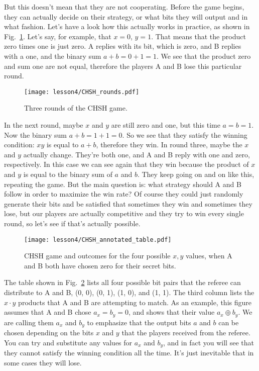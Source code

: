 But this doesn't mean that they are not cooperating. Before the game begins, they can actually decide on their strategy, or what bits they will output and in what fashion. Let's have a look how this actually works in practice, as shown in Fig.~\ref{fig:chsh-game-rounds}. Let's say, for example, that $x =0$, $y = 1$. That means that the product zero times one is just zero. A replies with its bit, which is zero, and B replies with a one, and the binary sum $a + b = 0 + 1 = 1$. We see that the product zero and sum one are not equal, therefore the players A and B lose this particular round.
\begin{figure}[H]
    \centering
    \texttt{[image: lesson4/CHSH\_rounds.pdf]}
        \caption{Three rounds of the CHSH game.}
    \label{fig:chsh-game-rounds}
\end{figure}

In the next round, maybe $x$ and $y$ are still zero and one, but this time $a = b = 1$. Now the binary sum $a + b = 1 + 1 = 0$. So we see that they satisfy the winning condition: $xy$ is equal to $a + b$, therefore they win. In round three, maybe the $x$ and $y$ actually change. They're both one, and A and B reply with one and zero, respectively. In this case we can see again that they win because the product of $x$ and $y$ is equal to the binary sum of $a$ and $b$. They keep going on and on like this, repeating the game. But the main question is: what strategy should A and B follow in order to maximize the win rate? Of course they could just randomly generate their bits and be satisfied that sometimes they win and sometimes they lose, but our players are actually competitive and they try to win every single round, so let's see if that's actually possible.

\begin{figure}[H]
    \centering
    \texttt{[image: lesson4/CHSH\_annotated\_table.pdf]}
        \caption[CHSH game and outcomes]{CHSH game and outcomes for the four possible $x, y$ values, when A and B both have chosen zero for their secret bits.}
    \label{fig:chsh-table}
\end{figure}

The table shown in Fig.~\ref{fig:chsh-table} lists all four possible bit pairs that the referee can distribute to A and B, (0, 0), (0, 1), (1, 0), and (1, 1). The third column lists the $x\cdot y$ products that A and B are attempting to match. As an example, this figure assumes that A and B chose $a_x = b_y = 0$, and shows that their value $a_x \oplus b_y$. We are calling them $a_x$ and $b_y$ to emphasize that the output bits $a$ and $b$ can be chosen depending on the bits $x$ and $y$ that the players received from the referee. You can try and substitute any values for $a_x$ and $b_y$, and in fact you will see that they cannot satisfy the winning condition all the time. It's just inevitable that in some cases they will lose.

